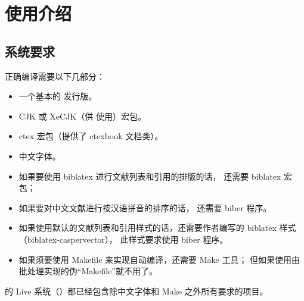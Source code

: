 %
%
%
%

\chapter{使用介绍}
\section{系统要求}\label{sec:req}

正确编译需要以下几部分：
\begin{itemize}
	\item 一个基本的  发行版。
	\item CJK 或 XeCJK（供  使用）宏包。
	\item ctex 宏包（提供了 ctexbook 文档类）。
	\item 中文字体。
	\item 如果要使用 biblatex 进行文献列表和引用的排版的话，
		还需要 biblatex 宏包；
	\item 如果要对中文文献进行按汉语拼音的排序的话，
		还需要 biber 程序。
	\item 如果使用默认的文献列表和引用样式的话，还需要作者编写的 biblatex 样式
		（biblatex-caspervector），
		此样式要求使用 biber 程序。
	\item 如果须要使用 Makefile 来实现自动编译，还需要 Make 工具；
		但如果使用由批处理实现的伪“Makefile”就不用了。
\end{itemize}

的  Live 系统（）都已经包含除中文字体和 Make 之外所有要求的项目。%

